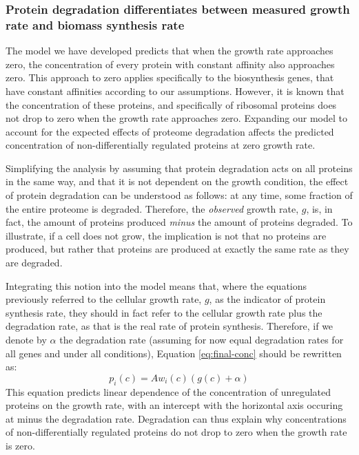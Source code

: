 \subsubsection{Protein degradation differentiates between measured growth rate and biomass synthesis rate}
The model we have developed predicts that when the growth rate approaches zero, the concentration of every protein with constant affinity also approaches zero.
This approach to zero applies specifically to the biosynthesis genes, that have constant affinities according to our assumptions.
However, it is known that the concentration of these proteins, and specifically of ribosomal proteins does not drop to zero when the growth rate approaches zero.
Expanding our model to account for the expected effects of proteome degradation affects the predicted concentration of non-differentially regulated proteins at zero growth rate.

Simplifying the analysis by assuming that protein degradation acts on all proteins in the same way, and that it is not dependent on the growth condition, the effect of protein degradation can be understood as follows: at any time, some fraction of the entire proteome is degraded.
Therefore, the \emph{observed} growth rate, $g$, is, in fact, the amount of proteins produced \emph{minus} the amount of proteins degraded.
To illustrate, if a cell does not grow, the implication is not that no proteins are produced, but rather that proteins are produced at exactly the same rate as they are degraded.

Integrating this notion into the model means that, where the equations previously referred to the cellular growth rate, $g$, as the indicator of protein synthesis rate, they should in fact refer to the cellular growth rate plus the degradation rate, as that is the real rate of protein synthesis.
Therefore, if we denote by $\alpha$ the degradation rate (assuming for now equal degradation rates for all genes and under all conditions), Equation \ref{eq:final-conc} should be rewritten as:
\begin{equation}
  \label{eq:final-conc-deg}
  p_i(c)=Aw_i(c)(g(c)+\alpha)
\end{equation}
This equation predicts linear dependence of the concentration of unregulated proteins on the growth rate, with an intercept with the horizontal axis occuring at minus the degradation rate.
Degradation can thus explain why concentrations of non-differentially regulated proteins do not drop to zero when the growth rate is zero.